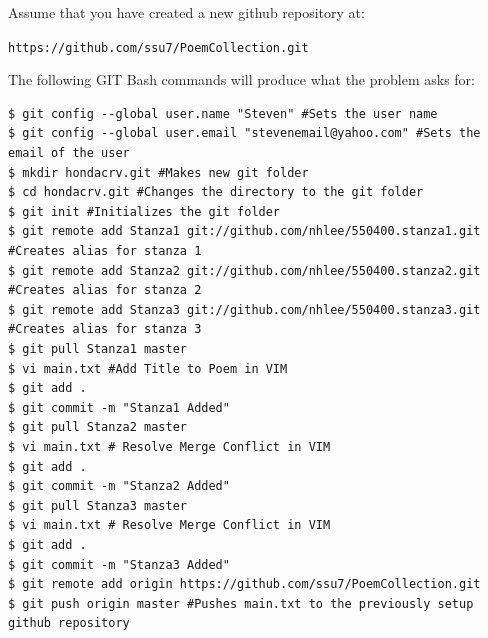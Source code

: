 \documentclass[12pt]{article}
\begin{document}
\noindent Assume that you have created a new github repository at: 
\begin{center} 
\texttt{https://github.com/ssu7/PoemCollection.git}
\end{center} 
The following GIT Bash commands will produce what the problem asks for:
\begin{lstlisting}
$ git config --global user.name "Steven" #Sets the user name
$ git config --global user.email "stevenemail@yahoo.com" #Sets the email of the user
$ mkdir hondacrv.git #Makes new git folder
$ cd hondacrv.git #Changes the directory to the git folder
$ git init #Initializes the git folder
$ git remote add Stanza1 git://github.com/nhlee/550400.stanza1.git #Creates alias for stanza 1
$ git remote add Stanza2 git://github.com/nhlee/550400.stanza2.git #Creates alias for stanza 2
$ git remote add Stanza3 git://github.com/nhlee/550400.stanza3.git #Creates alias for stanza 3
$ git pull Stanza1 master
$ vi main.txt #Add Title to Poem in VIM
$ git add .
$ git commit -m "Stanza1 Added"
$ git pull Stanza2 master
$ vi main.txt # Resolve Merge Conflict in VIM
$ git add .
$ git commit -m "Stanza2 Added"
$ git pull Stanza3 master
$ vi main.txt # Resolve Merge Conflict in VIM
$ git add .
$ git commit -m "Stanza3 Added"
$ git remote add origin https://github.com/ssu7/PoemCollection.git
$ git push origin master #Pushes main.txt to the previously setup github repository
\end{lstlisting}


\end{document}
